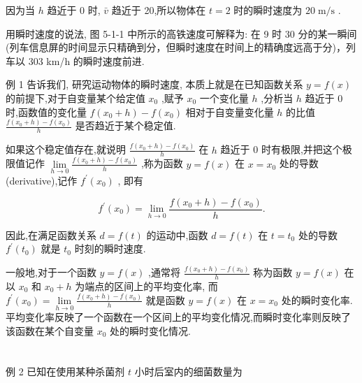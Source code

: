 \documentclass[10pt]{article}
\begin{document}
因为当 \(h\) 趋近于 0 时, \(\bar{v}\) 趋近于 20,所以物体在 \(t = 2\) 时的瞬时速度为 \({20}\mathrm{\;m}/\mathrm{s}\) .

用瞬时速度的说法, 图 5-1-1 中所示的高铁速度可解释为: 在 9 时 30 分的某一瞬间(列车信息屏的时间显示只精确到分，但瞬时速度在时间上的精确度远高于分)，列车以 303 km/h 的瞬时速度前进.

例 1 告诉我们, 研究运动物体的瞬时速度, 本质上就是在已知函数关系 \(y = f\left( x\right)\) 的前提下,对于自变量某个给定值 \({x}_{0}\) ,赋予 \({x}_{0}\) 一个变化量 \(h\) ,分析当 \(h\) 趋近于 0 时,函数值的变化量 \(f\left( {{x}_{0} + h}\right)  - f\left( {x}_{0}\right)\) 相对于自变量变化量 \(h\) 的比值 \(\frac{f\left( {{x}_{0} + h}\right)  - f\left( {x}_{0}\right) }{h}\) 是否趋近于某个稳定值.

如果这个稳定值存在,就说明 \(\frac{f\left( {{x}_{0} + h}\right)  - f\left( {x}_{0}\right) }{h}\) 在 \(h\) 趋近于 0 时有极限,并把这个极限值记作 \(\mathop{\lim }\limits_{{h \rightarrow  0}}\frac{f\left( {{x}_{0} + h}\right)  - f\left( {x}_{0}\right) }{h}\) ,称为函数 \(y = f\left( x\right)\) 在 \(x = {x}_{0}\) 处的导数 (derivative),记作 \({f}^{\prime }\left( {x}_{0}\right)\) , 即有

\[
{f}^{\prime }\left( {x}_{0}\right)  = \mathop{\lim }\limits_{{h \rightarrow  0}}\frac{f\left( {{x}_{0} + h}\right)  - f\left( {x}_{0}\right) }{h}.
\]

因此,在满足函数关系 \(d = f\left( t\right)\) 的运动中,函数 \(d = f\left( t\right)\) 在 \(t = {t}_{0}\) 处的导数 \({f}^{\prime }\left( {t}_{0}\right)\) 就是 \({t}_{0}\) 时刻的瞬时速度.

一般地,对于一个函数 \(y = f\left( x\right)\) ,通常将 \(\frac{f\left( {{x}_{0} + h}\right)  - f\left( {x}_{0}\right) }{h}\) 称为函数 \(y = f\left( x\right)\) 在以 \({x}_{0}\) 和 \({x}_{0} + h\) 为端点的区间上的平均变化率, 而 \({f}^{\prime }\left( {x}_{0}\right)  = \mathop{\lim }\limits_{{h \rightarrow  0}}\frac{f\left( {{x}_{0} + h}\right)  - f\left( {x}_{0}\right) }{h}\) 就是函数 \(y = f\left( x\right)\) 在 \(x = {x}_{0}\) 处的瞬时变化率. 平均变化率反映了一个函数在一个区间上的平均变化情况,而瞬时变化率则反映了该函数在某个自变量 \({x}_{0}\) 处的瞬时变化情况.

\section*{}



例 2 已知在使用某种杀菌剂 \(t\) 小时后室内的细菌数量为
\end{document}
